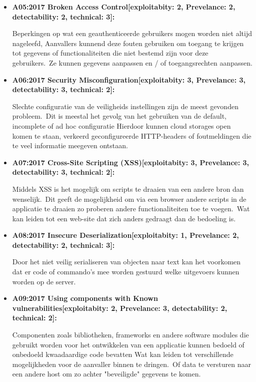 \begin{itemize}
    \item \textbf{A05:2017 Broken Access Control[exploitabity: 2, Prevelance: 2, detectability: 2, technical: 3]:}

    Beperkingen op wat een geauthenticeerde gebruikers mogen worden niet altijd nageleefd, Aanvallers kunnend deze fouten gebruiken om toegang te krijgen tot gegevens of functionaliteiten die niet bestemd zijn voor deze gebruikers.\ Ze kunnen gegevens aanpassen en / of toegangsrechten aanpassen.

    \item \textbf{A06:2017 Security Misconfiguration[exploitabity: 3, Prevelance: 3, detectability: 3, technical: 2]:}

    Slechte configuratie van de veiligheids instellingen zijn de meest gevonden probleem.\ Dit is meestal het gevolg van het gebruiken van de default, incomplete of ad hoc configuratie Hierdoor kunnen cloud storages open komen te staan, verkeerd geconfigureerde HTTP-headers of foutmeldingen die te veel informatie meegeven ontstaan.

    \item \textbf{A07:2017 Cross-Site Scripting (XSS)[exploitabity: 3, Prevelance: 3, detectability: 3, technical: 2]:}

    Middels XSS is het mogelijk om scripts te draaien van een andere bron dan wenselijk.\ Dit geeft de mogelijkheid om via een browser andere scripts in de applicatie te draaien zo proberen andere functionaliteiten toe te voegen.\ Wat kan leiden tot een web-site dat zich anders gedraagt dan de bedoeling is.

    \item \textbf{A08:2017 Insecure Deserialization[exploitabity: 1, Prevelance: 2, detectability: 2, technical: 3]:}

    Door het niet veilig serialiseren van objecten naar text kan het voorkomen dat er code of commando's mee worden gestuurd welke uitgevoers kunnen worden op de server.

    \item \textbf{A09:2017 Using components with Known vulnerabilities[exploitabity: 2, Prevelance: 3, detectability: 2, technical: 2]:}

    Componenten zoals bibliotheken, frameworks en andere software modules die gebruikt worden voor het ontwikkelen van een applicatie kunnen bedoeld of onbedoeld kwaadaardige code bevatten Wat kan leiden tot verschillende mogelijkheden voor de aanvaller binnen te dringen.\ Of data te versturen naar een andere host om zo achter "beveiligde" gegevens te komen.


\end{itemize}
